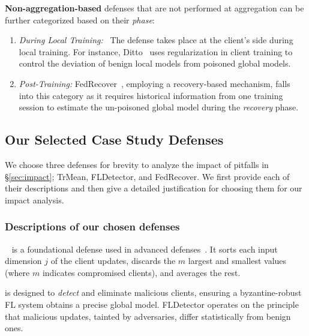 \noindent\textbf{Non-aggregation-based} defenses that are not performed at aggregation can be further categorized based on their \emph{phase}:
\begin{enumerate}[leftmargin=*, label=\alph*), wide]
    \item \emph{During Local Training:}~\cite{zhang2022flip, li2021ditto, chang2019cronus} The defense takes place at the client's side during local training. For instance, Ditto~\cite{li2021ditto} uses regularization in client training to control the deviation of benign local models from poisoned global models.
    \item \emph{Post-Training:} FedRecover~\cite{cao2022fedrecover}, employing a recovery-based mechanism, falls into this category as it requires historical information from one training session to estimate the un-poisoned global model during the \emph{recovery} phase.
\end{enumerate}


\subsection{Our Selected Case Study Defenses}\label{systemization:justification}

We choose three defenses for brevity to analyze the impact of pitfalls in \S\ref{sec:impact}; TrMean, FLDetector, and FedRecover. We first provide each of their descriptions and then give a detailed justification for choosing them for our impact analysis.

\subsubsection{Descriptions of our chosen defenses}\label{systemization:defenses_study:descriptions}
~\cite{yin2018byzantine}
\label{background:trmean}
is a foundational defense used in advanced defenses~\cite{cao2022fedrecover,zhang2022fldetector,shejwalkar2021manipulating}. It sorts each input dimension $j$ of the client updates, discards the $m$ largest and smallest values (where $m$ indicates compromised clients), and averages the rest.

\label{background:fld}
is designed to \emph{detect} and eliminate malicious clients, ensuring a byzantine-robust FL system obtains a precise global model. FLDetector operates on the principle that malicious updates, tainted by adversaries, differ statistically from benign ones.


